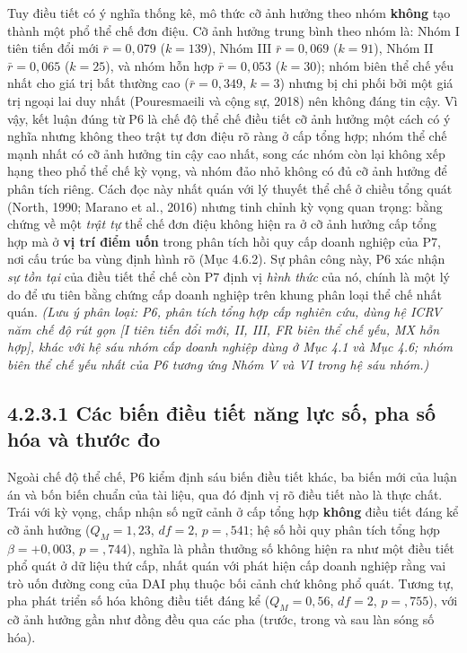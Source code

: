 \documentclass[
  a4paper,
  13pt]{extreport}
\begin{document}
Tuy điều tiết có ý nghĩa thống kê, mô thức cỡ ảnh hưởng theo nhóm
\textbf{không} tạo thành một phổ thể chế đơn điệu. Cỡ ảnh hưởng trung
bình theo nhóm là: Nhóm I tiên tiến đổi mới \(\bar{r} = 0{,}079\)
(\(k = 139\)), Nhóm III \(\bar{r} = 0{,}069\) (\(k = 91\)), Nhóm II
\(\bar{r} = 0{,}065\) (\(k = 25\)), và nhóm hỗn hợp
\(\bar{r} = 0{,}053\) (\(k = 30\)); nhóm biên thể chế yếu nhất cho giá
trị bất thường cao (\(\bar{r} = 0{,}349\), \(k = 3\)) nhưng bị chi phối
bởi một giá trị ngoại lai duy nhất (Pouresmaeili và cộng sự, 2018) nên
không đáng tin cậy. Vì vậy, kết luận đúng từ P6 là chế độ thể chế điều
tiết cỡ ảnh hưởng một cách có ý nghĩa nhưng không theo trật tự đơn điệu
rõ ràng ở cấp tổng hợp; nhóm thể chế mạnh nhất có cỡ ảnh hưởng tin cậy
cao nhất, song các nhóm còn lại không xếp hạng theo phổ thể chế kỳ vọng,
và nhóm đảo nhỏ không có đủ cỡ ảnh hưởng để phân tích riêng. Cách đọc
này nhất quán với lý thuyết thể chế ở chiều tổng quát (North, 1990;
Marano et al., 2016) nhưng tinh chỉnh kỳ vọng quan trọng: bằng chứng về
một \emph{trật tự} thể chế đơn điệu không hiện ra ở cỡ ảnh hưởng cấp
tổng hợp mà ở \textbf{vị trí điểm uốn} trong phân tích hồi quy cấp doanh
nghiệp của P7, nơi cấu trúc ba vùng định hình rõ (Mục 4.6.2). Sự phân
công này, P6 xác nhận \emph{sự tồn tại} của điều tiết thể chế còn P7
định vị \emph{hình thức} của nó, chính là một lý do để ưu tiên bằng
chứng cấp doanh nghiệp trên khung phân loại thể chế nhất quán.
\emph{(Lưu ý phân loại: P6, phân tích tổng hợp cấp nghiên cứu, dùng hệ
ICRV năm chế độ rút gọn {[}I tiên tiến đổi mới, II, III, FR biên thể chế
yếu, MX hỗn hợp{]}, khác với hệ sáu nhóm cấp doanh nghiệp dùng ở Mục 4.1
và Mục 4.6; nhóm biên thể chế yếu nhất của P6 tương ứng Nhóm V và VI
trong hệ sáu nhóm.)}

\hypertarget{cuxe1c-biux1ebfn-ux111iux1ec1u-tiux1ebft-nux103ng-lux1ef1c-sux1ed1-pha-sux1ed1-huxf3a-vuxe0-thux1b0ux1edbc-ux111o}{%
\subsection{4.2.3.1 Các biến điều tiết năng lực số, pha số hóa và thước
đo}\label{cuxe1c-biux1ebfn-ux111iux1ec1u-tiux1ebft-nux103ng-lux1ef1c-sux1ed1-pha-sux1ed1-huxf3a-vuxe0-thux1b0ux1edbc-ux111o}}

Ngoài chế độ thể chế, P6 kiểm định sáu biến điều tiết khác, ba biến mới
của luận án và bốn biến chuẩn của tài liệu, qua đó định vị rõ điều tiết
nào là thực chất. Trái với kỳ vọng, chấp nhận số ngữ cảnh ở cấp tổng hợp
\textbf{không} điều tiết đáng kể cỡ ảnh hưởng (\(Q_M = 1{,}23\),
\(df = 2\), \(p = {,}541\); hệ số hồi quy phân tích tổng hợp
\(\beta = +0{,}003\), \(p = {,}744\)), nghĩa là phần thưởng số không
hiện ra như một điều tiết phổ quát ở dữ liệu thứ cấp, nhất quán với phát
hiện cấp doanh nghiệp rằng vai trò uốn đường cong của DAI phụ thuộc bối
cảnh chứ không phổ quát. Tương tự, pha phát triển số hóa không điều tiết
đáng kể (\(Q_M = 0{,}56\), \(df = 2\), \(p = {,}755\)), với cỡ ảnh hưởng
gần như đồng đều qua các pha (trước, trong và sau làn sóng số hóa).
\end{document}
